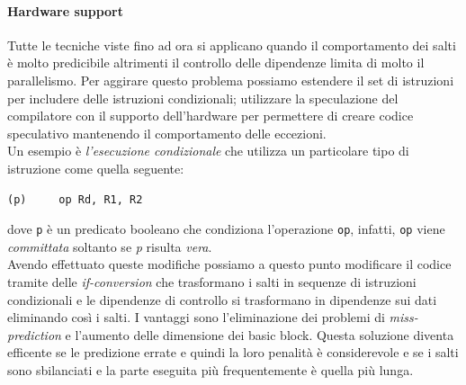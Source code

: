 \paragraph{Hardware support}
Tutte le tecniche viste fino ad ora si applicano quando il comportamento dei salti è molto predicibile altrimenti il controllo delle dipendenze limita di molto il parallelismo. Per aggirare questo problema possiamo estendere il set di istruzioni per includere delle istruzioni condizionali; utilizzare la speculazione del compilatore con il supporto dell'hardware per permettere di creare codice speculativo mantenendo il comportamento delle eccezioni.\\
Un esempio è \emph{l'esecuzione condizionale} che utilizza un particolare tipo di istruzione come quella seguente:
\begin{verbatim}
(p)		op Rd, R1, R2
\end{verbatim}
dove \texttt{p} è un predicato booleano che condiziona l'operazione \texttt{op}, infatti, \texttt{op} viene \emph{committata} soltanto se \emph{p} risulta \emph{vera}.\\
Avendo effettuato queste modifiche possiamo a questo punto modificare il codice tramite delle \emph{if-conversion} che trasformano i salti in sequenze di istruzioni condizionali e le dipendenze di controllo si trasformano in dipendenze sui dati eliminando così i salti. I vantaggi sono l'eliminazione dei problemi di \emph{miss-prediction} e l'aumento delle dimensione dei basic block. Questa soluzione diventa efficente se le predizione errate e quindi la loro penalità è considerevole e se i salti sono sbilanciati e la parte eseguita più frequentemente è quella più lunga.
